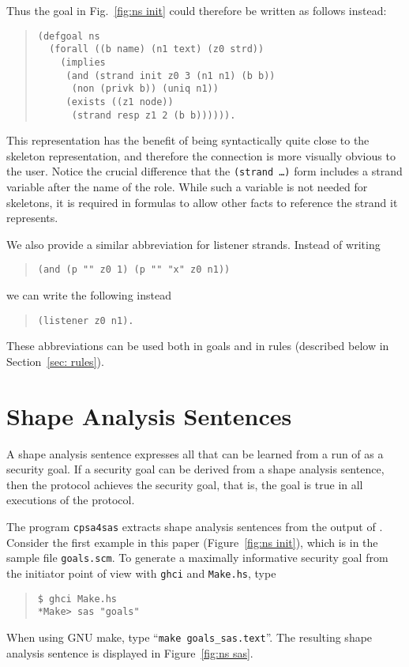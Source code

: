 Thus the goal in Fig.~\ref{fig:ns init} could therefore be written as
follows instead:

\begin{quote}
\begin{verbatim}
(defgoal ns
  (forall ((b name) (n1 text) (z0 strd))
    (implies
     (and (strand init z0 3 (n1 n1) (b b))
      (non (privk b)) (uniq n1))
     (exists ((z1 node))
      (strand resp z1 2 (b b)))))).
\end{verbatim}
\end{quote}

This representation has the benefit of being syntactically quite close
to the skeleton representation, and therefore the connection is more
visually obvious to the user. Notice the crucial difference that the
\texttt{(strand  \ldots)} form includes a strand variable
after the name of the role. While such a variable is not needed for
skeletons, it is required in formulas to allow other facts to
reference the strand it represents.

We also provide a similar abbreviation for listener strands. Instead
of writing

\begin{quote}
\begin{verbatim}
(and (p "" z0 1) (p "" "x" z0 n1))
\end{verbatim}
\end{quote}
we can write the following instead
\begin{quote}
\begin{verbatim}
(listener z0 n1).
\end{verbatim}
\end{quote}

These abbreviations can be used both in goals and in rules (described
below in Section~\ref{sec: rules}).

\section{Shape Analysis Sentences}\label{sec:sas}

A shape analysis sentence expresses all that can be learned from a run
of {\cpsa} as a security goal.  If a security goal can be derived from
a shape analysis sentence, then the protocol achieves the security
goal, that is, the goal is true in all executions of the protocol.

The program \texttt{cpsa4sas} extracts shape analysis sentences from
the output of {\cpsa}.  Consider the first example in this paper
(Figure~\ref{fig:ns init}), which is in the sample file
\texttt{goals.scm}.  To generate a maximally informative security goal
from the initiator point of view with \texttt{ghci} and
\texttt{Make.hs}, type
\begin{quote}
\begin{verbatim}
$ ghci Make.hs
*Make> sas "goals"
\end{verbatim}
\end{quote}
When using GNU make, type ``\texttt{make goals\_sas.text}''.  The
resulting shape analysis sentence is displayed in Figure~\ref{fig:ns
  sas}.

